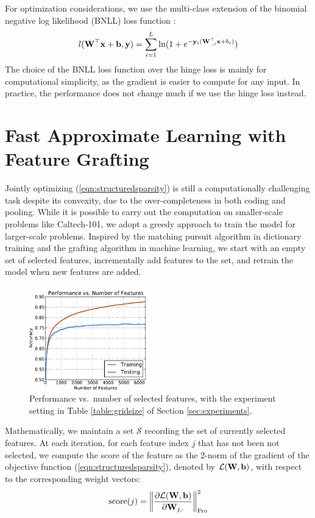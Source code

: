 For optimization considerations, we use the multi-class extension of the binomial negative log likelihood (BNLL) loss function \cite{Perkins:2003vc}:
\begin{equation}
  l(\mathbf{W}^\top\mathbf{x} + \mathbf{b}, \mathbf{y}) = \sum_{i=1}^{L}\ln(1+e^{-\mathbf{y}_i(\mathbf{W}_{\cdot,i}^\top \mathbf{x} + b_i)})
\end{equation}
The choice of the BNLL loss function over the hinge loss is mainly for computational simplicity, as the gradient is easier to compute for any input. In practice, the performance does not change much if we use the hinge loss instead.

\section{Fast Approximate Learning with Feature Grafting}
Jointly optimizing (\ref{eqn:structuredsparsity}) is still a computationally challenging task despite its convexity, due to the over-completeness in both coding and pooling. While it is possible to carry out the computation on smaller-scale problems like Caltech-101, we adopt a greedy approach to train the model for larger-scale problems. Inspired by the matching pursuit algorithm in dictionary training and the grafting algorithm \cite{Perkins:2003vc} in machine learning, we start with an empty set of selected features, incrementally add features to the set, and retrain the model when new features are added. 

\begin{figure}
  \centering
  \includegraphics[width=0.5\textwidth]{figs/smartpooling/grafting_perf.pdf}
  \caption{Performance vs.\ number of selected features, with the experiment setting in Table \ref{table:gridsize} of Section \ref{sec:experiments}.}\label{fig:graftingsteps}
\end{figure}

Mathematically, we maintain a set $\mathcal{S}$ recording the set of currently selected features. At each iteration, for each feature index $j$ that has not been not selected, we compute the score of the feature as the 2-norm of the gradient of the objective function (\ref{eqn:structuredsparsity}), denoted by $\mathcal{L}(\mathbf{W},\mathbf{b})$, with respect to the corresponding weight vectors:
\begin{eqnarray}
  \operatorname{score}(j) = \left\|\frac{\partial \mathcal{L}(\mathbf{W},\mathbf{b})}{\partial \mathbf{W}_{j,\cdot}}\right\|_\mathrm{Fro}^2
\end{eqnarray}

